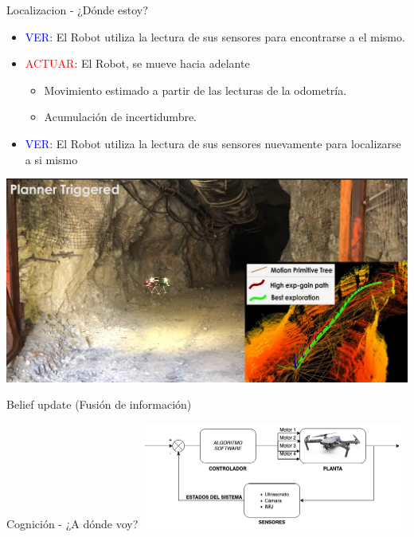 \documentclass[
  24pt, %
  aspectratio=169, %
]{beamer}
\begin{document}
\begin{frame}{Localizacion - ¿Dónde estoy?}

  \begin{minipage}{0.47\textwidth}
    \begin{itemize}
    \item \textcolor{blue}{VER}: El Robot utiliza la lectura de sus sensores para encontrarse a el mismo.
      \bigskip %
    \item \textcolor{red}{ACTUAR}: El Robot, se mueve hacia adelante
      \begin{itemize}
      \item Movimiento estimado a partir de las lecturas de la odometría.
      \item Acumulación de incertidumbre.
      \end{itemize}
      \bigskip %
    \item \textcolor{blue}{VER}: El Robot utiliza la lectura de sus sensores nuevamente para localizarse a si mismo
    \end{itemize}
  \end{minipage}
  \hspace{0.2cm}
  \begin{minipage}{0.5\textwidth}
    \includegraphics[width=1\textwidth]{vant_autonomo}
  \end{minipage}
    
  \bigskip %
  Belief update (Fusión de información)
\end{frame}

\begin{frame}{Cognición - ¿A dónde voy?}
  \centering
  \includegraphics[width=0.65\textwidth]{control_drone.png}
\end{frame}
\end{document}
